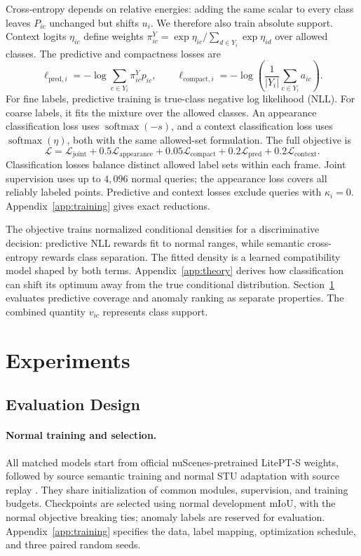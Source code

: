 \documentclass{article}
\begin{document}
Cross-entropy depends on relative energies: adding the same scalar to every class leaves $P_{ic}$ unchanged but shifts $u_i$. We therefore also train absolute support. Context logits $\eta_{ic}$ define weights $\pi^Y_{ic}=\exp\eta_{ic}/\sum_{d\in Y_i}\exp\eta_{id}$ over allowed classes. The predictive and compactness losses are
\begin{equation}
 \ell_{\mathrm{pred},i}=-\log\sum_{c\in Y_i}\pi^Y_{ic}p_{ic},\qquad
 \ell_{\mathrm{compact},i}=-\log\left(\frac1{|Y_i|}\sum_{c\in Y_i}a_{ic}\right).
 \label{eq:absolute}
\end{equation}
For fine labels, predictive training is true-class negative log likelihood (NLL). For coarse labels, it fits the mixture over the allowed classes. An appearance classification loss uses $\operatorname{softmax}(-s)$, and a context classification loss uses $\operatorname{softmax}(\eta)$, both with the same allowed-set formulation. The full objective is
\begin{equation}
 \mathcal L=\mathcal L_{\mathrm{joint}}+0.5\mathcal L_{\mathrm{appearance}}
 +0.05\mathcal L_{\mathrm{compact}}+0.2\mathcal L_{\mathrm{pred}}
 +0.2\mathcal L_{\mathrm{context}}.
 \label{eq:loss}
\end{equation}
Classification losses balance distinct allowed label sets within each frame. Joint supervision uses up to $4{,}096$ normal queries; the appearance loss covers all reliably labeled points. Predictive and context losses exclude queries with $\kappa_i=0$. Appendix~\ref{app:training} gives exact reductions.

The objective trains normalized conditional densities for a discriminative decision: predictive NLL rewards fit to normal ranges, while semantic cross-entropy rewards class separation. The fitted density is a learned compatibility model shaped by both terms. Appendix~\ref{app:theory} derives how classification can shift its optimum away from the true conditional distribution. Section~\ref{sec:experiments} evaluates predictive coverage and anomaly ranking as separate properties. The combined quantity $v_{ic}$ represents class support.

\section{Experiments}
\label{sec:experiments}
\subsection{Evaluation Design}
\paragraph{Normal training and selection.}
All matched models start from official nuScenes-pretrained LitePT-S weights, followed by source semantic training and normal STU adaptation with source replay \citep{nuscenes}. They share initialization of common modules, supervision, and training budgets. Checkpoints are selected using normal development mIoU, with the normal objective breaking ties; anomaly labels are reserved for evaluation. Appendix~\ref{app:training} specifies the data, label mapping, optimization schedule, and three paired random seeds.
\end{document}
